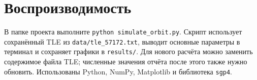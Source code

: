 \documentclass[12pt,a4paper]{article}
\begin{document}
    \section*{Воспроизводимость}

    В папке проекта выполните \texttt{python simulate\_orbit.py}. Скрипт использует сохранённый TLE
    из \texttt{data/tle\_57172.txt}, выводит основные параметры в терминал и сохраняет графики в
    \texttt{results/}. Для нового расчёта можно заменить содержимое файла TLE; численные значения
    отчёта после этого также нужно обновить. Использованы Python, NumPy, Matplotlib и библиотека
    \texttt{sgp4}.
\end{document}
